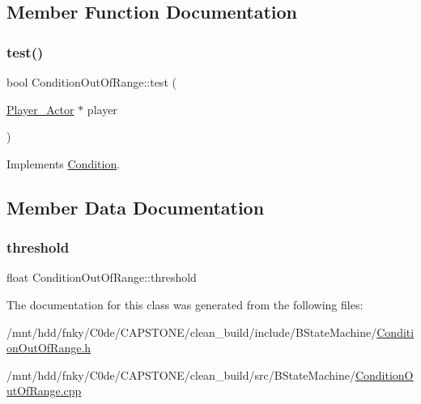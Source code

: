 \subsection{Member Function Documentation}
\mbox{\label{classConditionOutOfRange_a8e09e943dedb3c8b482e5934975abc25}} 
\subsubsection{\texorpdfstring{test()}{test()}}
{\footnotesize\ttfamily bool Condition\+Out\+Of\+Range\+::test (\begin{DoxyParamCaption}\item[{\hyperlink{classPlayer__Actor}{Player\+\_\+\+Actor} $\ast$}]{player }\end{DoxyParamCaption})\hspace{0.3cm}{\ttfamily [virtual]}}



Implements \hyperlink{classCondition_a4826569fb7c6f920884abb7583a081b6}{Condition}.



\subsection{Member Data Documentation}
\mbox{\label{classConditionOutOfRange_a2a9d369ba3db698dcc41e928ec0aa211}} 
\subsubsection{\texorpdfstring{threshold}{threshold}}
{\footnotesize\ttfamily float Condition\+Out\+Of\+Range\+::threshold\hspace{0.3cm}{\ttfamily [private]}}



The documentation for this class was generated from the following files\+:\begin{DoxyCompactItemize}
\item 
/mnt/hdd/fnky/\+C0de/\+C\+A\+P\+S\+T\+O\+N\+E/clean\+\_\+build/include/\+B\+State\+Machine/\hyperlink{ConditionOutOfRange_8h}{Condition\+Out\+Of\+Range.\+h}\item 
/mnt/hdd/fnky/\+C0de/\+C\+A\+P\+S\+T\+O\+N\+E/clean\+\_\+build/src/\+B\+State\+Machine/\hyperlink{ConditionOutOfRange_8cpp}{Condition\+Out\+Of\+Range.\+cpp}\end{DoxyCompactItemize}
